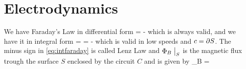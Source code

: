 \documentclass[oneside, 12pt, notitlepage]{book}
\begin{document}
\frontmatter
\mainmatter
\pagestyle{mynotespage} %

\chapter{Electrodynamics}

We have Faraday's Law in differential form
\beq[]  = -  \eeq
which is always valid, and we have it in integral form
\beq[eq:intfaraday] \varepsilon {} = \uoint[\del{S}]  \cdot {} = -   \eeq
which is valid in low speeds and \(c = \partial{S}\). The minus sign in \eqref{eq:intfaraday} is called Lenz Law and \( \Phi_B \at{S}\) is the magnetic flux trough the surface \(S\) enclosed by the circuit \(C\) and is given by
\beq[]  \Phi_B  = \uint[S]\cdot {}\eeq
\end{document}
